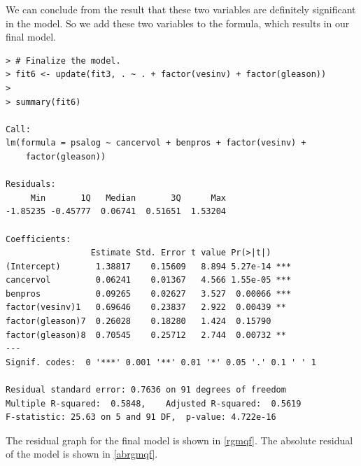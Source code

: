 \documentclass[12pt,letterpaper,titlepage,en-US]{article}
\begin{document}
We can conclude from the result that these two variables are definitely
significant in the model. So we add these two variables to the formula, which results in our final model.
\begin{lstlisting}
> # Finalize the model.
> fit6 <- update(fit3, . ~ . + factor(vesinv) + factor(gleason))
>
> summary(fit6)

Call:
lm(formula = psalog ~ cancervol + benpros + factor(vesinv) +
    factor(gleason))

Residuals:
     Min       1Q   Median       3Q      Max
-1.85235 -0.45777  0.06741  0.51651  1.53204

Coefficients:
                 Estimate Std. Error t value Pr(>|t|)
(Intercept)       1.38817    0.15609   8.894 5.27e-14 ***
cancervol         0.06241    0.01367   4.566 1.55e-05 ***
benpros           0.09265    0.02627   3.527  0.00066 ***
factor(vesinv)1   0.69646    0.23837   2.922  0.00439 **
factor(gleason)7  0.26028    0.18280   1.424  0.15790
factor(gleason)8  0.70545    0.25712   2.744  0.00732 **
---
Signif. codes:  0 '***' 0.001 '**' 0.01 '*' 0.05 '.' 0.1 ' ' 1

Residual standard error: 0.7636 on 91 degrees of freedom
Multiple R-squared:  0.5848,    Adjusted R-squared:  0.5619
F-statistic: 25.63 on 5 and 91 DF,  p-value: 4.722e-16
\end{lstlisting}

\pagebreak
The residual graph for the final model is shown in \cref{rgmqf}.
The absolute residual of the model is shown in \cref{abrgmqf}.
\end{document}
